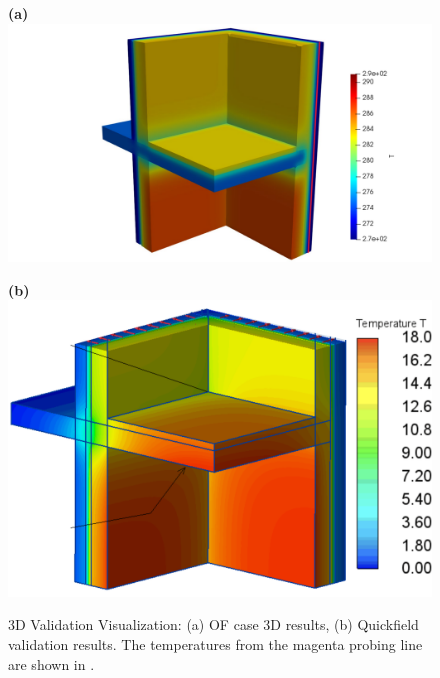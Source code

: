 \documentclass[runningheads]{llncs}
\begin{document}
\begin{figure}[tbh]
    \centering
    \begin{minipage}[b]{0.45\linewidth}
        \centering
        \textbf{(a)}\\
        \includegraphics[trim=5cm 0cm 4.5cm 0cm, clip, width=\linewidth]{Figures/newvalleg.pdf}
    \end{minipage}
    \hspace{0.5cm}  %
    \begin{minipage}[b]{0.45\linewidth}
        \centering
        \textbf{(b)}\\
        \includegraphics[width=\linewidth]{Figures/ValidationCaseClean.png}
    \end{minipage}
    \caption{3D Validation Visualization: (a) OF case 3D results, (b) Quickfield validation results. The temperatures from the magenta probing line are shown in .}
    \label{fig:paraview}
\end{figure}
\end{document}

